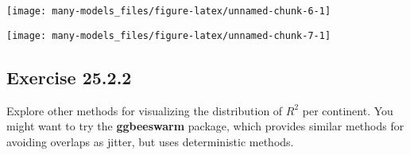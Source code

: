 \documentclass[]{book}
\newenvironment{Shaded}{\begin{snugshade}}{\end{snugshade}}
\newcommand{\CommentTok}[1]{\textcolor[rgb]{0.56,0.35,0.01}{\textit{#1}}}
\newcommand{\DataTypeTok}[1]{\textcolor[rgb]{0.13,0.29,0.53}{#1}}
\newcommand{\DecValTok}[1]{\textcolor[rgb]{0.00,0.00,0.81}{#1}}
\newcommand{\FloatTok}[1]{\textcolor[rgb]{0.00,0.00,0.81}{#1}}
\newcommand{\KeywordTok}[1]{\textcolor[rgb]{0.13,0.29,0.53}{\textbf{#1}}}
\newcommand{\NormalTok}[1]{#1}
\newcommand{\OperatorTok}[1]{\textcolor[rgb]{0.81,0.36,0.00}{\textbf{#1}}}
\newcommand{\OtherTok}[1]{\textcolor[rgb]{0.56,0.35,0.01}{#1}}
\newcommand{\StringTok}[1]{\textcolor[rgb]{0.31,0.60,0.02}{#1}}
\theoremstyle{plain}
\theoremstyle{remark}
\begin{document}
\begin{Shaded}
\end{Shaded}

\begin{center}\texttt{[image: many-models\_files/figure-latex/unnamed-chunk-6-1]} \end{center}

\begin{Shaded}
\end{Shaded}

\begin{center}\texttt{[image: many-models\_files/figure-latex/unnamed-chunk-7-1]} \end{center}

\hypertarget{exercise-25.2.2}{%
\subsection*{\texorpdfstring{Exercise
{25.2.2}}{Exercise 25.2.2}}\label{exercise-25.2.2}}

Explore other methods for visualizing the distribution of \(R^2\) per
continent. You might want to try the \textbf{ggbeeswarm} package, which
provides similar methods for avoiding overlaps as jitter, but uses
deterministic methods.
\end{document}
